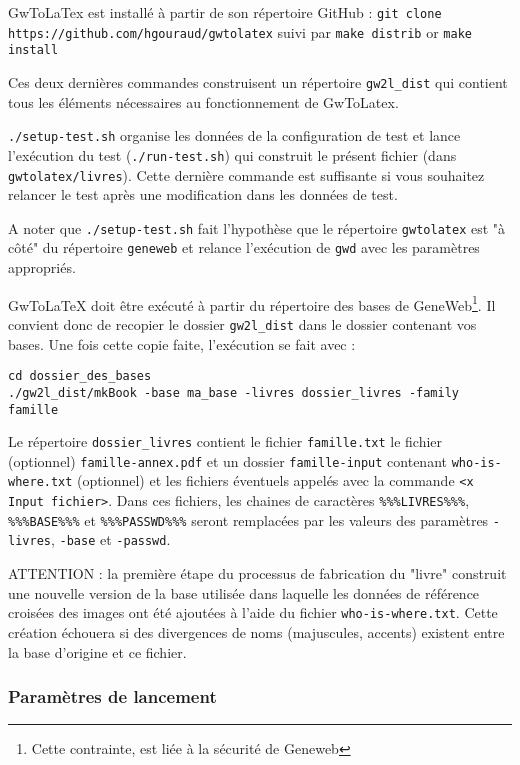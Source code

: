 GwToLaTex est installé à partir de son répertoire GitHub :
\verb|git clone https://github.com/hgouraud/gwtolatex|
suivi par
\verb|make distrib| or \verb|make install|

Ces deux dernières commandes construisent un répertoire \verb|gw2l_dist| qui
contient tous les éléments nécessaires au fonctionnement de GwToLatex.

\verb|./setup-test.sh| organise les données de la configuration de test et
lance l'exécution du test (\verb|./run-test.sh|) qui construit le présent
fichier (dans \verb|gwtolatex/livres|). Cette dernière commande est
suffisante si vous souhaitez relancer le test après une modification
dans les données de test.

A noter que \verb|./setup-test.sh| fait l'hypothèse que le répertoire
\verb|gwtolatex| est "à côté" du répertoire \verb|geneweb| et relance
l'exécution de \verb|gwd| avec les paramètres appropriés.

GwToLaTeX doit être exécuté à partir du répertoire des bases de
GeneWeb\footnote{Cette contrainte, est liée à la sécurité de Geneweb}.
Il convient donc de recopier le dossier \verb|gw2l_dist| dans le
dossier contenant vos bases. Une fois cette copie faite, l'exécution se
fait avec :
\begin{verbatim}
cd dossier_des_bases
./gw2l_dist/mkBook -base ma_base -livres dossier_livres -family famille
\end{verbatim}

Le répertoire \verb|dossier_livres| contient le fichier \verb|famille.txt|
le fichier (optionnel) \verb|famille-annex.pdf| et un dossier
\verb|famille-input| contenant \verb|who-is-where.txt| (optionnel)
et les fichiers éventuels appelés avec la commande \verb|<x Input fichier>|.
Dans ces fichiers, les chaines de caractères \verb|%%%LIVRES%%%|,
\verb|%%%BASE%%%| et \verb|%%%PASSWD%%%| seront remplacées par les valeurs
des paramètres \verb|-livres|, \verb|-base| et \verb|-passwd|.

ATTENTION : la première étape du processus de fabrication du "livre" construit une 
nouvelle version de la base utilisée dans laquelle les données de référence
croisées des images ont été ajoutées à l'aide du fichier \verb|who-is-where.txt|.
Cette création échouera si des divergences de noms (majuscules, accents) existent
entre la base d'origine et ce fichier.

\subsubsection{Paramètres de lancement}

